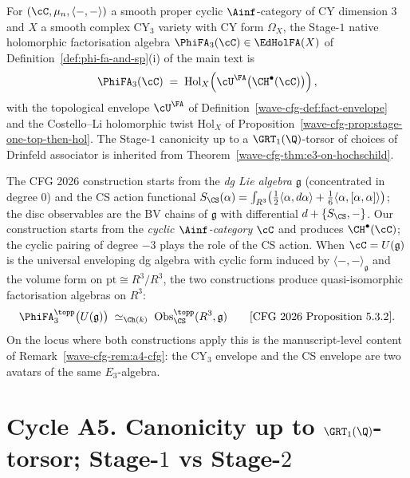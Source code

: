 \begin{theorem}[$\PhiFA_3(\cC)=\cU^\FA(\CH^\bullet(\cC))$ after holomorphic twist]
\label{wave-cfg-thm:phifa3-as-envelope}
For $(\cC,\mu_n,\langle-,-\rangle)$ a smooth proper cyclic $\Ainf$-category
of CY dimension $3$ and $X$ a smooth complex CY$_3$ variety with CY form
$\Omega_X$, the Stage-$1$ native holomorphic factorisation algebra
$\PhiFA_3(\cC)\in\EdHolFA(X)$ of Definition~\ref{def:phi-fa-and-sp}(i)
of the main text is
\[
\PhiFA_3(\cC)\;=\;\mathrm{Hol}_X\!\left(\cU^\FA\bigl(\CH^\bullet(\cC)\bigr)\right),
\]
with the topological envelope $\cU^\FA$ of
Definition~\ref{wave-cfg-def:fact-envelope} and the Costello--Li
holomorphic twist $\mathrm{Hol}_X$ of
Proposition~\ref{wave-cfg-prop:stage-one-top-then-hol}. The Stage-$1$
canonicity up to a $\GRT_1(\Q)$-torsor of choices of Drinfeld associator
is inherited from Theorem~\ref{wave-cfg-thm:e3-on-hochschild}.
\end{theorem}

\begin{remark}
\label{wave-cfg-rem:a4-cfg}
The CFG 2026 construction starts from the \emph{dg Lie algebra}
$\mathfrak g$ (concentrated in degree $0$) and the CS action functional
$S_{\CS}(\alpha)=\int_{R^3}\bigl(\frac12\langle\alpha,d\alpha\rangle+
\frac16\langle\alpha,[\alpha,\alpha]\rangle\bigr)$; the disc observables
are the BV chains of $\mathfrak g$ with differential $d+\{S_{\CS},-\}$.
Our construction starts from the \emph{cyclic $\Ainf$-category}
$\cC$ and produces $\CH^\bullet(\cC)$; the cyclic pairing of degree
$-3$ plays the role of the CS action. When $\cC = U(\mathfrak g)$ is
the universal enveloping dg algebra with cyclic form induced by
$\langle-,-\rangle_{\mathfrak g}$ and the volume form on
$\mathrm{pt}\cong R^3/R^3$, the two constructions produce
quasi-isomorphic factorisation algebras on $R^3$:
\[
\PhiFA_3^\topp\bigl(U(\mathfrak g)\bigr)\;\simeq_{\Ch(k)}\;
\mathrm{Obs}_{\CS}^{\topp}(R^3,\mathfrak g)
\qquad\text{[CFG 2026 Proposition 5.3.2]}.
\]
On the locus where both constructions apply this is the
manuscript-level content of Remark~\ref{wave-cfg-rem:a4-cfg}: the
CY$_3$ envelope and the CS envelope are two avatars of the same
$E_3$-algebra.
\end{remark}

\section*{Cycle A5. Canonicity up to $\GRT_1(\Q)$-torsor; Stage-$1$ vs Stage-$2$}

